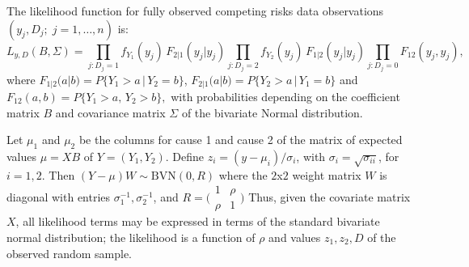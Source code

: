 \documentclass[twoside,a4paper,12pt]{article}
\newcommand{\EE}{\mathbb{E}}
\newcommand{\D}{\mathbb{D}}
\theoremstyle{plain}
\theoremstyle{definition}
\begin{document}

The {likelihood function} for fully observed competing risks data observations 
$(y_j, D_j; \; j=1,\ldots,n)$ is:
{\small
\begin{equation}\label{lik2}
L_{y,D}(B, \Sigma) = \prod_{j: D_j=1} f_{Y_1}(y_j) \, F_{2|1}(y_j|y_j) %
    \prod_{j: D_j=2} f_{Y_2}(y_j) \, F_{1|2}(y_j|y_j) %
    \prod_{j: D_j=0} F_{12}(y_j, y_j), %
\end{equation}
where $F_{1|2}(a|b) =P\{Y_1 > a \,|\, {Y_2 = b\}}$, $F_{2|1}(a|b) =P\{Y_2 > a \,|\, {Y_1 = b\}}$ and $F_{12}(a,b)= {P\{Y_1>a,} \, {Y_2>b\},}$ %
with probabilities depending on the coefficient matrix $B$ and covariance matrix $\Sigma$ of the bivariate Normal distribution.
}

Let $\mu_1$ and $\mu_2$ be the columns for cause 1 and cause 2 of the matrix of expected values $\mu=X B$ of $Y=(Y_1,Y_2)$.  %
Define $z_{i}= (y -\mu_{i})/\sigma_i$,  %
with $ \sigma_i = \sqrt{\sigma_{ii}}$,
for $i=1,2$.
Then $(Y-\mu) W   \sim \text{BVN}(0, R)$ where the $2$x$2$ weight matrix $W$ is diagonal with entries $\sigma_1^{-1}, \sigma_2^{-1}$,
and 
% 
$R= \bigl(\begin{smallmatrix} 1& \rho \\ \rho & 1 \end{smallmatrix} \bigr)$
Thus, given the covariate matrix $X$, all likelihood terms may be expressed in terms of the standard bivariate normal distribution;
the likelihood is a function of $\rho$ and values $z_1, z_2, D$ of the observed random sample.
\end{document}
